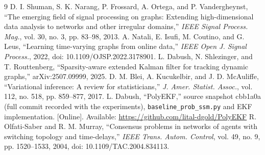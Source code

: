 \documentclass[journal]{IEEEtran}
\begin{document}
\begin{thebibliography}{9}
 D. I. Shuman, S. K. Narang, P. Frossard, A. Ortega, and P. Vandergheynst, ``The emerging field of signal processing on graphs: Extending high-dimensional data analysis to networks and other irregular domains,'' \emph{IEEE Signal Process. Mag.}, vol. 30, no. 3, pp. 83--98, 2013.
 A. Natali, E. Isufi, M. Coutino, and G. Leus, ``Learning time-varying graphs from online data,'' \emph{IEEE Open J. Signal Process.}, 2022, doi: 10.1109/OJSP.2022.3178901.
 L. Dabush, N. Shlezinger, and T. Routtenberg, ``Sparsity-aware extended Kalman filter for tracking dynamic graphs,'' arXiv:2507.09999, 2025.
 D. M. Blei, A. Kucukelbir, and J. D. McAuliffe, ``Variational inference: A review for statisticians,'' \emph{J. Amer. Statist. Assoc.}, vol. 112, no. 518, pp. 859--877, 2017.
 L. Dabush, ``PolyEKF,'' source snapshot cbb1a0a (full commit recorded with the experiments), \texttt{baseline\_prob\_ssm.py} and EKF implementation. [Online]. Available: \url{https://github.com/lital-dgold/PolyEKF}
 R. Olfati-Saber and R. M. Murray, ``Consensus problems in networks of agents with switching topology and time-delays,'' \emph{IEEE Trans. Autom. Control}, vol. 49, no. 9, pp. 1520--1533, 2004, doi: 10.1109/TAC.2004.834113.
\end{thebibliography}
\end{document}
